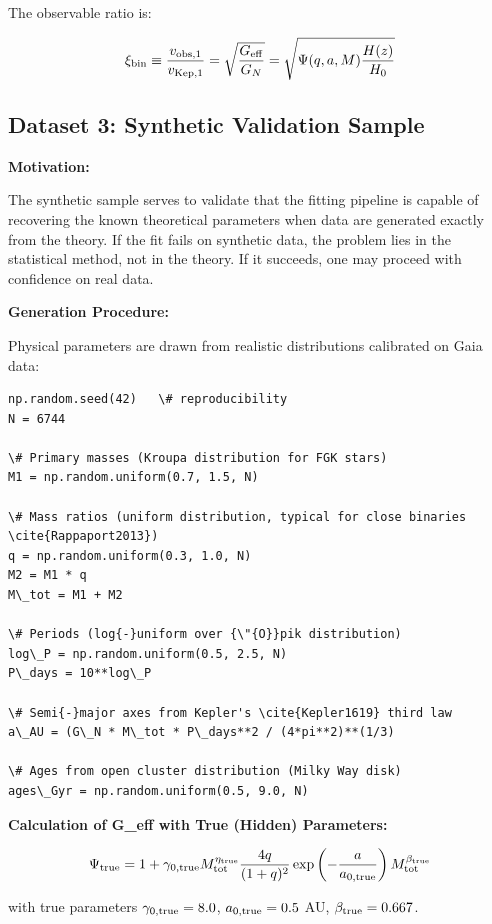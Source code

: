 \documentclass[11pt,a4paper]{article}
\begin{document}
The observable ratio is:

\[\xi_{\rm bin} \equiv \frac{v_{\rm obs,1}}{v_{\rm Kep,1}} = \sqrt{\frac{G_{\rm eff}}{G_N}} = \sqrt{\Psi(q,a,M) \frac{H(z)}{H_0}}\]

\hypertarget{dataset-3-synthetic-validation-sample}{%
\subsection{Dataset 3: Synthetic Validation
Sample}\label{dataset-3-synthetic-validation-sample}}

\textbf{Motivation:}

The synthetic sample serves to validate that the fitting pipeline is
capable of recovering the known theoretical parameters when data are
generated exactly from the theory. If the fit fails on synthetic data,
the problem lies in the statistical method, not in the theory. If it
succeeds, one may proceed with confidence on real data.

\textbf{Generation Procedure:}

Physical parameters are drawn from realistic distributions calibrated on
Gaia data:

\begin{lstlisting}
np.random.seed(42)   \# reproducibility
N = 6744

\# Primary masses (Kroupa distribution for FGK stars)
M1 = np.random.uniform(0.7, 1.5, N)

\# Mass ratios (uniform distribution, typical for close binaries \cite{Rappaport2013})
q = np.random.uniform(0.3, 1.0, N)
M2 = M1 * q
M\_tot = M1 + M2

\# Periods (log{-}uniform over {\"{O}}pik distribution)
log\_P = np.random.uniform(0.5, 2.5, N)
P\_days = 10**log\_P

\# Semi{-}major axes from Kepler's \cite{Kepler1619} third law
a\_AU = (G\_N * M\_tot * P\_days**2 / (4*pi**2)**(1/3)

\# Ages from open cluster distribution (Milky Way disk)
ages\_Gyr = np.random.uniform(0.5, 9.0, N)
\end{lstlisting}

\textbf{Calculation of G\_eff with True (Hidden) Parameters:}

\[\Psi_{\rm true} = 1 + \gamma_{0,\rm true} M_{\rm tot}^{\eta_{\rm true}} \frac{4q}{(1+q)^2} \exp\left(-\frac{a}{a_{0,\rm true}}\right) M_{\rm tot}^{\beta_{\rm true}}\]

with true parameters \(\gamma_{0,\rm true} = 8.0\),
\(a_{0,\rm true} = 0.5\) AU, \(\beta_{\rm true} = 0.667\).
\end{document}
